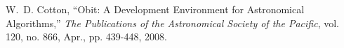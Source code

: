 \documentclass[10pt,onecolumn,final]{IEEEtran}
\begin{document}


%

%


\ifCLASSOPTIONcaptionsoff
  \newpage
\fi





%
%
%
\begin{thebibliography}{1}

W.~D. Cotton, ``Obit: A Development Environment for Astronomical Algorithms,'' \emph{The Publications of the Astronomical Society of the Pacific}, vol. 120, no. 866, Apr., pp. 439-448, 2008.


\end{thebibliography}
\end{document}
